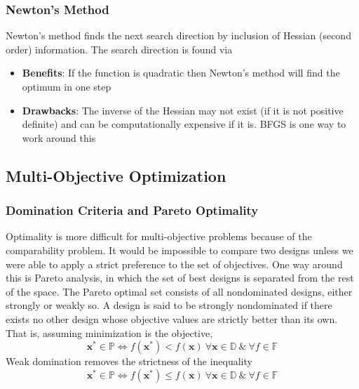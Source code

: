 \documentclass[12pt]{article}
\newcommand{\Item}[1]{\item \textbf{#1}:}
\newcommand{\CenteredBoxed}[1]{\begin{center}\boxed{#1}\end{center}}
\newcommand{\boldx}{\mathbf{x}}
\newcommand{\xstar}{\boldx^*}
\begin{document}
\subsubsection{Newton's Method}
Newton's method finds the next search direction by inclusion of Hessian (second order) information. The search direction is found via
\CenteredBoxed{\mathbf{s}_{k+1}=-\left[H(\boldx_k)\right]^{-1}\nabla f(\boldx_k)}
\begin{itemize}
\Item{Benefits} If the function is quadratic then Newton's method will find the optimum in one step
\Item{Drawbacks} The inverse of the Hessian may not exist (if it is not positive definite) and can be computationally expensive if it is. BFGS is one way to work around this
\end{itemize}

\subsection{Multi-Objective Optimization}
\subsubsection{Domination Criteria and Pareto Optimality}
Optimality is more difficult for multi-objective problems because of the comparability problem. It would be impossible to compare two designs unless we were able to apply a strict preference to the set of objectives. One way around this is Pareto analysis, in which the set of best designs is separated from the rest of the space. The Pareto optimal set consists of all nondominated designs, either strongly or weakly so. A design is said to be strongly nondominated if there exists no other design whose objective values are strictly better than its own. That is, assuming minimization is the objective,
$$\xstar\in\mathbb{P}\iff f(\xstar)<f(\boldx)\ \forall\boldx\in\mathbb{D}\ \&\ \forall f\in\mathbb{F}$$
Weak domination removes the strictness of the inequality
$$\xstar\in\mathbb{P}\iff f(\xstar)\leq f(\boldx)\ \forall\boldx\in\mathbb{D}\ \&\ \forall f\in\mathbb{F}$$
\end{document}
